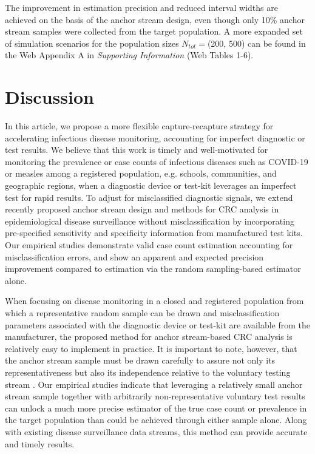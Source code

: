 \documentclass[useAMS,usenatbib,referee]{biom}
\begin{document}
The improvement in estimation precision and reduced interval widths are achieved on the basis of the anchor stream design, even though only 10\% anchor stream samples were collected from the target population. A more expanded set of simulation scenarios for the population sizes $N_{tot}=$(200, 500) can be found in the Web Appendix A in \textit{Supporting Information} (Web Tables 1-6).

\section{Discussion}

In this article, we propose a more flexible capture-recapture strategy for accelerating infectious disease monitoring, accounting for imperfect diagnostic or test results. We believe that this work is timely and well-motivated for monitoring the prevalence or case counts of infectious diseases such as COVID-19 or measles among a registered population, e.g. schools, communities, and geographic regions, when a diagnostic device or test-kit leverages an imperfect test for rapid results. To adjust for misclassified diagnostic signals, we extend recently proposed anchor stream design and methods \citep{Lyles2022a,Lyles2022b} for CRC analysis in epidemiological disease surveillance without misclassification by incorporating pre-specified sensitivity and specificity information from manufactured test kits. Our empirical studies demonstrate valid case count estimation accounting for misclassification errors, and show an apparent and expected precision improvement compared to estimation via the random sampling-based estimator alone.	

When focusing on disease monitoring in a closed and registered population from which a representative random sample can be drawn and misclassification parameters associated with the diagnostic device or test-kit are available from the manufacturer, the proposed method for anchor stream-based CRC analysis is relatively easy to implement in practice. It is important to note, however, that the anchor stream sample must be drawn carefully to assure not only its representativeness but also its independence relative to the voluntary testing stream \citep{Lyles2022a}. Our empirical studies indicate that leveraging a relatively small anchor stream sample together with arbitrarily non-representative voluntary test results can unlock a much more precise estimator of the true case count or prevalence in the target population than could be achieved through either sample alone. Along with existing disease surveillance data streams, this method can provide accurate and timely results. 
\end{document}
